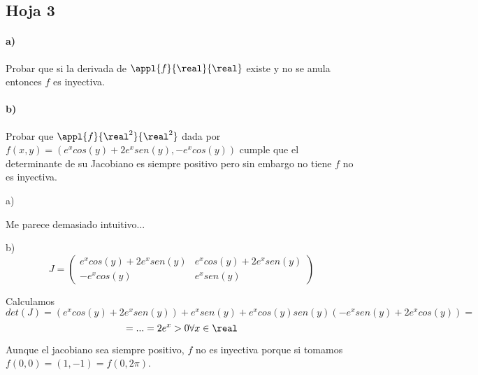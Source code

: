 \subsection{Hoja 3}
\begin{problem}[3]
\paragraph{a)} Probar que si la derivada de $\appl{f}{\real}{\real}$ existe y no se anula entonces $f$ es inyectiva.
\paragraph{b)} Probar que $\appl{f}{\real^2}{\real^2}$ dada por $f(x,y) =( e^xcos(y) + 2e^xsen(y),-e^xcos(y))$ cumple que el determinante de su Jacobiano es siempre positivo pero sin embargo no tiene $f$ no es inyectiva.

\solution

a)

Me parece demasiado intuitivo...

b)
$$J = \begin{pmatrix}
       e^xcos(y)+2e^xsen(y) & e^xcos(y)+2e^xsen(y) \\
       -e^xcos(y) & e^xsen(y)
      \end{pmatrix}
$$

Calculamos $$det(J) = (e^xcos(y)+2e^xsen(y))+e^xsen(y) + e^xcos(y)sen(y)(-e^xsen(y)+2e^xcos(y)) = $$
$$ = ... = 2e^x > 0 \forall x \in \real$$

Aunque el jacobiano sea siempre positivo, $f$ no es inyectiva porque si tomamos $f(0,0) = (1,-1) = f(0,2\pi)$.
\end{problem}

